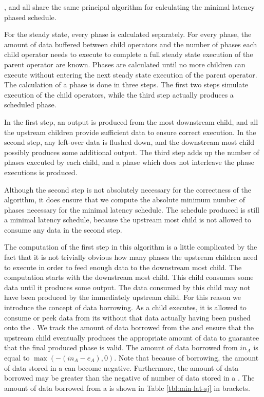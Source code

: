{\pipeline}, {\splitjoin} and {\feedbackloop} all share the same
principal algorithm for calculating the minimal latency phased
schedule.

For the steady state, every phase is calculated separately. For
every phase, the amount of data buffered between child operators
and the number of phases each child operator needs to execute to
complete a full steady state execution of the parent operator are
known. Phases are calculated until no more children can execute
without entering the next steady state execution of the parent
operator. The calculation of a phase is done in three steps. The
first two steps simulate execution of the child operators, while
the third step actually produces a scheduled phase.

In the first step, an output is produced from the most downstream
child, and all the upstream children provide sufficient data to
ensure correct execution. In the second step, any left-over data
is flushed down, and the downstream most child possibly produces
some additional output. The third step adds up the number of
phases executed by each child, and a phase which does not
interleave the phase executions is produced.

Although the second step is not absolutely necessary for the
correctness of the algorithm, it does ensure that we compute the
absolute minimum number of phases necessary for the minimal
latency schedule. The schedule produced is still a minimal latency
schedule, because the upstream most child is not allowed to
consume any data in the second step.

The computation of the first step in this algorithm is a little
complicated by the fact that it is not trivially obvious how many
phases the upstream children need to execute in order to feed
enough data to the downstream most child. The computation starts
with the downstream most child. This child consumes some data
until it produces some output. The data consumed by this child may
not have been produced by the immediately upstream child. For this
reason we introduce the concept of data borrowing. As a child
executes, it is allowed to consume or peek data from its {\Input}
{\Channel} without that data actually having been pushed onto the
{\Channel}. We track the amount of data borrowed from the
{\Channel} and ensure that the upstream child eventually produces
the appropriate amount of data to guarantee that the final
produced phase is valid. The amount of data borrowed from
{\Channel} $in_A$ is equal to $\max(-(in_A - e_A),0)$. Note that
because of borrowing, the amount of data stored in a {\Channel}
can become negative. Furthermore, the amount of data borrowed may
be greater than the negative of number of data stored in a
{\Channel}. The amount of data borrowed from a {\Channel} is shown
in Table \ref{tbl:min-lat-sj} in brackets.

